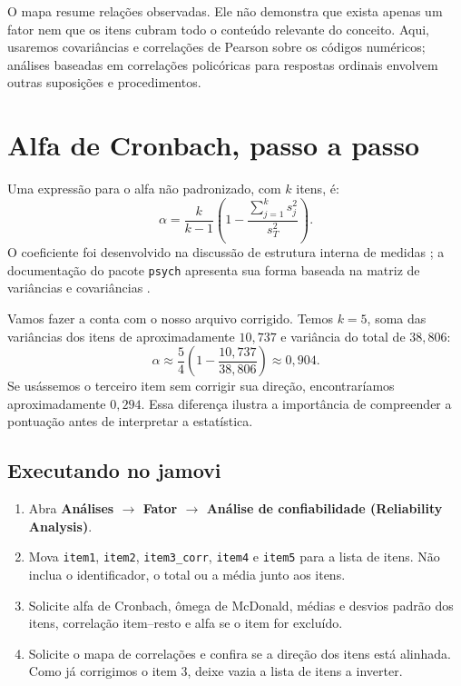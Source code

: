 O mapa resume relações observadas. Ele não demonstra que exista apenas um fator nem que os itens cubram todo o conteúdo relevante do conceito. Aqui, usaremos covariâncias e correlações de Pearson sobre os códigos numéricos; análises baseadas em correlações policóricas para respostas ordinais envolvem outras suposições e procedimentos.

\section{Alfa de Cronbach, passo a passo}

Uma expressão para o alfa não padronizado, com $k$ itens, é:
\[
\alpha=\frac{k}{k-1}\left(1-\frac{\sum_{j=1}^{k}s_j^2}{s_T^2}\right).
\]
O coeficiente foi desenvolvido na discussão de estrutura interna de medidas \parencite{Cronbach1951}; a documentação do pacote \texttt{psych} apresenta sua forma baseada na matriz de variâncias e covariâncias \parencite{RevelleAlpha}.

Vamos fazer a conta com o nosso arquivo corrigido. Temos $k=5$, soma das variâncias dos itens de aproximadamente $10{,}737$ e variância do total de $38{,}806$:
\[
\alpha\approx\frac54\left(1-\frac{10{,}737}{38{,}806}\right)
\approx0{,}904.
\]
Se usássemos o terceiro item sem corrigir sua direção, encontraríamos aproximadamente $0{,}294$. Essa diferença ilustra a importância de compreender a pontuação antes de interpretar a estatística.

\subsection{Executando no jamovi}

\begin{enumerate}
  \item Abra \textbf{Análises $\rightarrow$ Fator $\rightarrow$ Análise de confiabilidade (Reliability Analysis)}.
  \item Mova \texttt{item1}, \texttt{item2}, \texttt{item3\_corr}, \texttt{item4} e \texttt{item5} para a lista de itens. Não inclua o identificador, o total ou a média junto aos itens.
  \item Solicite alfa de Cronbach, ômega de McDonald, médias e desvios padrão dos itens, correlação item--resto e alfa se o item for excluído.
  \item Solicite o mapa de correlações e confira se a direção dos itens está alinhada. Como já corrigimos o item 3, deixe vazia a lista de itens a inverter.
\end{enumerate}

